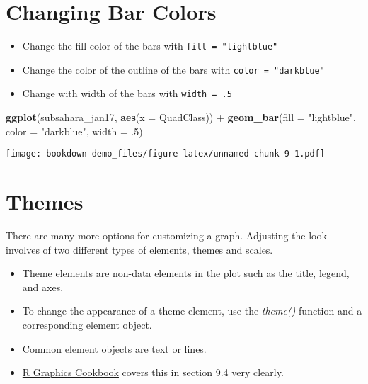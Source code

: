 \documentclass[]{book}
\newenvironment{Shaded}{\begin{snugshade}}{\end{snugshade}}
\newcommand{\KeywordTok}[1]{\textcolor[rgb]{0.13,0.29,0.53}{\textbf{{#1}}}}
\newcommand{\DataTypeTok}[1]{\textcolor[rgb]{0.13,0.29,0.53}{{#1}}}
\newcommand{\DecValTok}[1]{\textcolor[rgb]{0.00,0.00,0.81}{{#1}}}
\newcommand{\StringTok}[1]{\textcolor[rgb]{0.31,0.60,0.02}{{#1}}}
\newcommand{\NormalTok}[1]{{#1}}
\theoremstyle{definition}
\theoremstyle{definition}
\theoremstyle{remark}
\begin{document}
\section{Changing Bar Colors}\label{changing-bar-colors}

\begin{itemize}
\item
  Change the fill color of the bars with \texttt{fill\ =\ "lightblue"}
\item
  Change the color of the outline of the bars with
  \texttt{color\ =\ "darkblue"}
\item
  Change with width of the bars with \texttt{width\ =\ .5}
\end{itemize}

\begin{Shaded}
\begin{Highlighting}[]
\KeywordTok{ggplot}\NormalTok{(subsahara_jan17, }\KeywordTok{aes}\NormalTok{(}\DataTypeTok{x =} \NormalTok{QuadClass)) +}
\StringTok{  }\KeywordTok{geom_bar}\NormalTok{(}\DataTypeTok{fill =} \StringTok{"lightblue"}\NormalTok{, }\DataTypeTok{color =} \StringTok{"darkblue"}\NormalTok{, }\DataTypeTok{width =} \NormalTok{.}\DecValTok{5}\NormalTok{)}
\end{Highlighting}
\end{Shaded}

\texttt{[image: bookdown-demo\_files/figure-latex/unnamed-chunk-9-1.pdf]}

\section{Themes}\label{themes}

There are many more options for customizing a graph. Adjusting the look
involves of two different types of elements, themes and scales.

\begin{itemize}
\item
  Theme elements are non-data elements in the plot such as the title,
  legend, and axes.
\item
  To change the appearance of a theme element, use the \emph{theme()}
  function and a corresponding element object.
\item
  Common element objects are text or lines.
\item
  \href{http://ase.tufts.edu/bugs/guide/assets/R\%20Graphics\%20Cookbook.pdf}{R
  Graphics Cookbook} covers this in section 9.4 very clearly.
\end{itemize}
\end{document}
